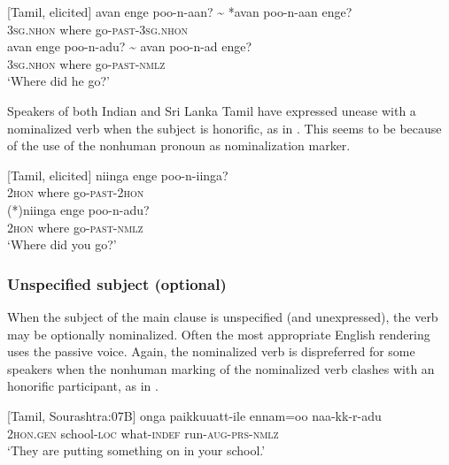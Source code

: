 \ea\label{smith:ex:15}
{}[Tamil, elicited]
\ea
\gll avan enge poo-n-aan? \~{} *avan poo-n-aan enge?\\
 3\textsc{sg}.\textsc{nhon} where go-\textsc{past}-3\textsc{sg}.\textsc{nhon} \\
\ex
\gll avan enge poo-n-adu? \~{} avan poo-n-ad enge?\\
3\textsc{sg}.\textsc{nhon} where go-\textsc{past}-\textsc{nmlz} \\
 `Where did he go?'
\z
\z

Speakers of both Indian and Sri Lanka Tamil have expressed unease with a nominalized verb when the subject is honorific, as in . This seems to be because of the use of the nonhuman pronoun as nominalization marker. 

\ea\label{smith:ex:16}
\ea
{}[Tamil, elicited]
\gll niinga enge poo-n-iinga? \\
2\textsc{hon} where go-\textsc{past}-2\textsc{hon}\\
\ex
\gll (*)niinga enge poo-n-adu? \\
 2\textsc{hon} where go-\textsc{past}-\textsc{nmlz} \\
`Where did you go?'
\z
\z

\subsubsection{Unspecified subject (optional)}%
 When the subject of the main clause is unspecified (and unexpressed), the verb may be optionally nominalized. Often the most appropriate English rendering uses the passive voice. Again, the nominalized verb is dispreferred for some speakers when the nonhuman marking of the nominalized verb clashes with an honorific participant, as in .

\ea\label{smith:ex:17}
{}[Tamil, Sourashtra:07B\footnotemark{}]
\gll onga pa{\textrtaill}{\textrtaill}ikkuu{\textrtaild}att-ile ennam=oo na{\textrtaild}a-kk-r-adu\\
 2\textsc{hon}.\textsc{gen} school-\textsc{loc} what-\textsc{indef}  run-\textsc{aug}-\textsc{prs}-\textsc{nmlz} \\
 `They are putting something on in your school.'
\z
{}


